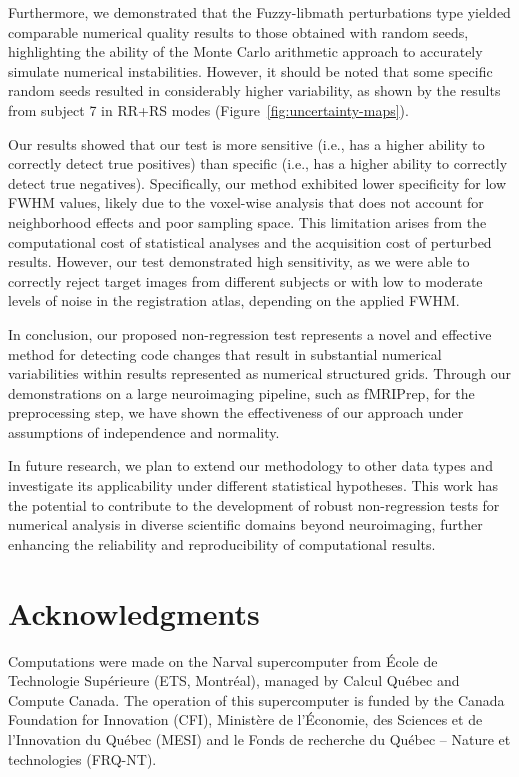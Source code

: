 \documentclass{article}
\newcommand{\fmriprep}{fMRIPrep\xspace}
\begin{document}
Furthermore, we demonstrated that the Fuzzy-libmath perturbations type yielded
comparable numerical quality results to those obtained with random seeds,
highlighting the ability of the Monte Carlo arithmetic approach to accurately
simulate numerical instabilities. However, it should be noted that some specific
random seeds resulted in considerably higher variability, as shown by the
results from subject 7 in RR+RS modes (Figure~\ref{fig:uncertainty-maps}).

Our results showed that our test is more sensitive (i.e., has a higher ability
to correctly detect true positives) than specific (i.e., has a higher ability to
correctly detect true negatives). Specifically, our method exhibited lower
specificity for low FWHM values, likely due to the voxel-wise analysis that does
not account for neighborhood effects and poor sampling space. This limitation
arises from the computational cost of statistical analyses and the acquisition
cost of perturbed results. However, our test demonstrated high sensitivity, as
we were able to correctly reject target images from different subjects or with
low to moderate levels of noise in the registration atlas, depending on the
applied FWHM.

In conclusion, our proposed non-regression test represents a novel and effective
method for detecting code changes that result in substantial numerical
variabilities within results represented as numerical structured grids. Through
our demonstrations on a large neuroimaging pipeline, such as \fmriprep, for the
preprocessing step, we have shown the effectiveness of our approach under
assumptions of independence and normality.

In future research, we plan to extend our methodology to other data types and
investigate its applicability under different statistical hypotheses. This work
has the potential to contribute to the development of robust non-regression
tests for numerical analysis in diverse scientific domains beyond neuroimaging,
further enhancing the reliability and reproducibility of computational results.

\section{Acknowledgments}

Computations were made on the Narval supercomputer from \'Ecole de Technologie
Sup\'erieure (ETS, Montr\'eal), managed by Calcul Québec and Compute Canada. The
operation of this supercomputer is funded by the Canada Foundation for
Innovation (CFI), Ministère de l’Économie, des Sciences et de l’Innovation du
Québec (MESI) and le Fonds de recherche du Québec – Nature et technologies
(FRQ-NT).
\end{document}
